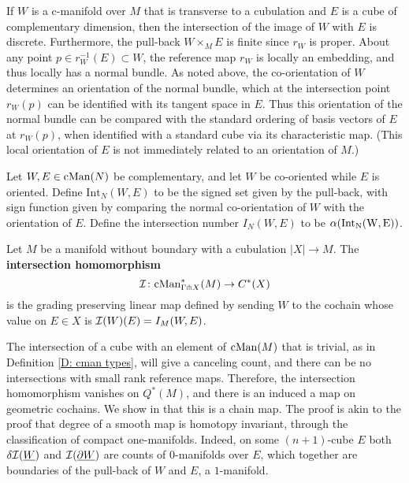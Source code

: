 If $W$ is a c-manifold over $M$ that is transverse to a cubulation and $E$ is a cube of complementary dimension, then the intersection of the image of $W$ with $E$ is discrete.
Furthermore, the pull-back $W \times_M E$ is finite since $r_W$ is proper.
About any point $p \in r_W^{-1}(E) \subset W$, the reference map $r_W$ is locally an embedding, and thus locally has a normal bundle.
As noted above, the co-orientation of $W$ determines an orientation of the normal bundle,
which at the intersection point $r_W(p)$ can be identified with its tangent space in $E$.
Thus this orientation of the normal bundle can be compared with the standard ordering of basis vectors of $E$ at $r_W(p)$, when identified with a standard cube via its characteristic map.
(This local orientation of $E$ is not immediately related to an orientation of $M$.)

\begin{definition}\label{D: intersection number}
	Let $W, E \in \mathrm{cMan}({N})$ be complementary, and let $W$ be co-oriented while $E$ is oriented. Define $\mathrm{Int}_N(W, E)$ to be the signed set given
	by the pull-back, with sign function given by comparing the normal co-orientation of $W$ with the orientation of $E$.
	Define the intersection number $I_N(W,E)$ to be $\alpha(\rm{Int}_N(W, E))$.
\end{definition}

\begin{definition}\label{D: intersection homomorphism}
	Let $M$ be a manifold without boundary with a cubulation $|X| \to M$.
	The \textbf{intersection homomorphism}
	\begin{equation*}
		\mathcal{I} \colon \mathrm{cMan}^*_{\Gamma \pitchfork X}(M) \to C^{\ast}(X)
	\end{equation*}
	is the grading preserving linear map defined by sending $W$ to the cochain whose value on $E \in X$ is $\mathcal{I}(W)(E) = I_M(W, E)$.
\end{definition}

The intersection of a cube with an element of $\mathrm{cMan}(M)$ that is trivial, as in Definition \ref{D: cman types}, will give a canceling count, and there can be no intersections with small rank reference maps.
Therefore, the intersection homomorphism vanishes on $Q^*(M)$, and there is an induced a map on geometric cochains.
We show in \cite{medina2022foundations} that this is a chain map.
The proof is akin to the proof that degree of a smooth map is homotopy invariant, through the classification of compact one-manifolds.
Indeed, on some $(n+1)$-cube $E$ both $\delta \mathcal{I}(\underline{W})$ and $\mathcal{I}(\underline{\partial W})$ are counts of $0$-manifolds over $E$, which together are boundaries of the pull-back of $W$ and $E$, a $1$-manifold.

